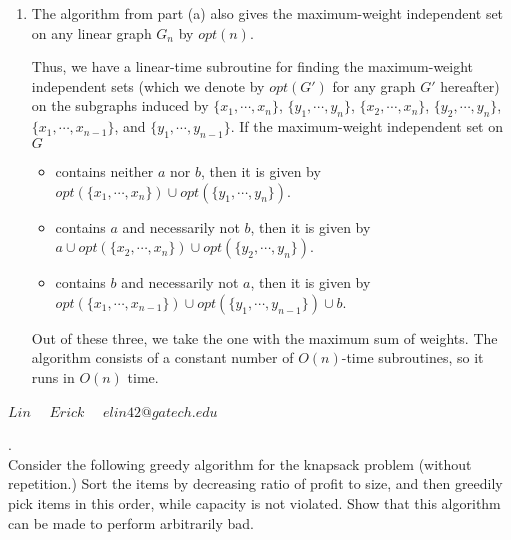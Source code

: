 \documentclass[a4paper,11pt]{article}
\begin{document}
\begin{enumerate}[label=(\alph*)]
    \item
        The algorithm from part (a) also gives the maximum-weight independent set on any linear graph $G_n$ by $opt(n)$. \par
        Thus, we have a linear-time subroutine for finding the maximum-weight independent sets (which we denote by $opt(G')$ for any graph $G'$ hereafter) on the subgraphs induced by $\{ x_1, \cdots, x_n \}$, $\{ y_1, \cdots, y_n \}$, $\{ x_2, \cdots, x_n \}$, $\{ y_2, \cdots, y_n \}$, $\{ x_1, \cdots, x_{n - 1} \}$, and $\{ y_1, \cdots, y_{n - 1} \}$. If the maximum-weight independent set on $G$
        \begin{itemize}
            \item
                contains neither $a$ nor $b$, then it is given by $opt(\{ x_1, \cdots, x_n \}) \cup opt(\{ y_1, \cdots, y_n \})$.
            \item
                contains $a$ and necessarily not $b$, then it is given by $a \cup opt(\{ x_2, \cdots, x_n \}) \cup opt(\{ y_2, \cdots, y_n \})$.
            \item
                contains $b$ and necessarily not $a$, then it is given by $opt(\{ x_1, \cdots, x_{n - 1} \}) \cup opt(\{ y_1, \cdots, y_{n - 1} \}) \cup b$.
        \end{itemize}
        Out of these three, we take the one with the maximum sum of weights. The algorithm consists of a constant number of $O(n)$-time subroutines, so it runs in $O(n)$ time.
\end{enumerate}


\pagebreak 

 $Lin \quad$
 $Erick \quad$
          $elin42@gatech.edu$\\

\bigskip


.  \\
Consider the following greedy algorithm for the knapsack problem (without repetition.)
Sort the items by decreasing ratio of profit to size,
and then greedily pick items in this order, while capacity is not violated. 
Show that this algorithm can be made to perform arbitrarily bad.\\
\end{document}
